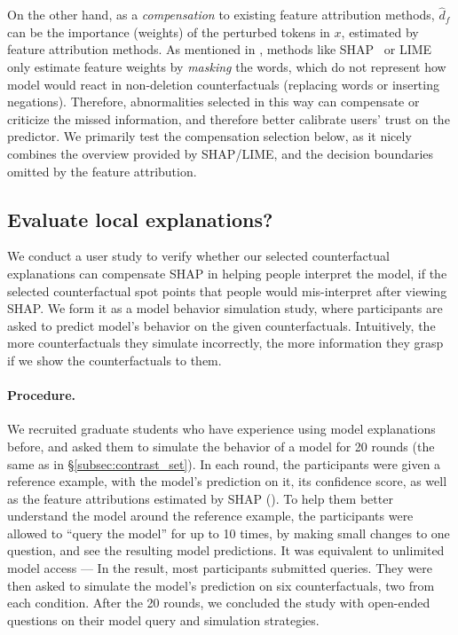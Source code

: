 On the other hand, as a \emph{compensation} to existing feature attribution methods, $\hat{d}_f$ can be the importance (weights) of the perturbed tokens in $x$, estimated by feature attribution methods.
As mentioned in \wts{\S\ref{}}, methods like SHAP~\cite{} or LIME~\cite{} only estimate feature weights by \emph{masking} the words, which do not represent how model would react in non-deletion counterfactuals (replacing words or inserting negations).
Therefore, abnormalities selected in this way can  compensate or criticize the missed information, and therefore better calibrate users' trust on the predictor.
We primarily test the compensation selection below, as it nicely combines the overview provided by SHAP/LIME, and the decision boundaries omitted by the feature attribution. 

\subsection{Evaluate local explanations?}
We conduct a user study to verify whether our selected counterfactual explanations can compensate SHAP in helping people interpret the model, \ie if the selected counterfactual spot points that people would mis-interpret after viewing SHAP.
We form it as a model behavior simulation study, where participants are asked to predict model's behavior on the given counterfactuals.
Intuitively, the more counterfactuals they simulate incorrectly, the more information they grasp if we show the counterfactuals to them.

\paragraph{Procedure.}
We recruited  graduate students who have experience using model explanations before, and asked them to simulate the behavior of a \qqp model for 20 rounds (the same as in \S\ref{subsec:contrast_set}).
In each round, the participants were given a reference example, with the model's prediction on it, its confidence score, as well as the feature attributions estimated by SHAP ().
To help them better understand the model around the reference example, the participants were allowed to ``query the model'' for up to 10 times, by making small changes to one question, and see the resulting model predictions.
It was equivalent to unlimited model access --- In the result, most participants submitted  queries.
They were then asked to simulate the model's prediction on six counterfactuals, two from each condition.
After the 20 rounds, we concluded the study with open-ended questions on their model query and simulation strategies.

